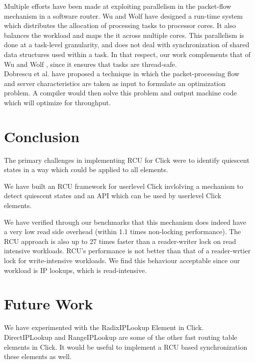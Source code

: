 \documentclass[a4paper]{article}
\begin{document}
Multiple efforts have been made at exploiting parallelism in the packet-flow mechanism in a software router. Wu and Wolf \cite{runtimepacketprocessing} have designed a run-time system which distributes the allocation of processing tasks to processor cores. It also balances the workload and maps the it across multiple cores. This parallelism is done at a task-level granularity, and does not deal with synchronization of shared data structures used within a task. In that respect, our work complements that of Wu and Wolf \cite{runtimepacketprocessing}, since it ensures that tasks are thread-safe.\\ 


Dobrescu et al. \cite{dobrescu} have proposed a technique in which the packet-processing flow and server characteristics are taken as input to formulate an optimization problem. A compiler would then solve this problem and output machine code which will optimize for throughput.
\pagebreak
\section{Conclusion}

The primary challenges in implementing RCU for Click were to
identify quiescent states in a way which could be applied to all
elements. 

We have built an RCU framework for userlevel Click invlolving a
mechanism to detect quiescent states and an API which can be used by userlevel Click elements.

We have verified through our benchmarks that this mechanism does
indeed have a very low read side overhead (within 1.1 times
non-locking performance). The RCU approach is also up to 27 times
faster than a reader-writer lock on read intensive workloads. RCU's performance is not better than that of a reader-wrtier lock for
write-intensive workloads. We find this behaviour acceptable since our
workload is IP lookups, which is read-intensive. 
\section{Future Work}

We have experimented with the RadixIPLookup Element in Click. DirectIPLookup and RangeIPLookup are some of the other fast routing table elements in Click. It would be useful to implement a RCU based synchronization these elements as well.\\ 
\end{document}

